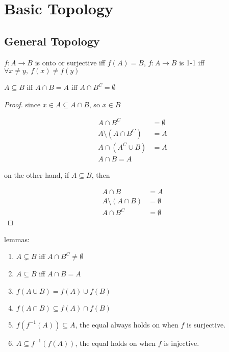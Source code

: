 \section{Basic Topology}

\subsection{General Topology}

\begin{definition}
    $f: A \to B$ is onto or surjective iff $f(A) = B$, $f: A \to B$ is 1-1 iff $\forall x \ne y,\: f(x) \ne f(y)$
\end{definition}

\begin{lem}
    $A \subseteq B$ iff $A \cap B = A$ iff $A \cap B^C = \emptyset$
\end{lem}


\begin{proof}
    since $x \in A \subseteq A \cap B$, so $x \in B$

    \begin{align*}
        A \cap B^C &= \emptyset \\
        A \setminus \left(A \cap B^C\right) &= A \\
        A \cap (A^C \cup B) &= A \\
        A \cap B = A 
    \end{align*}

    on the other hand, if $A \subseteq B$, then

    \begin{align*}
        A \cap B  &= A \\
        A \setminus \left(A \cap B \right) &= \emptyset \\
        A \cap B^C &= \emptyset
    \end{align*}
\end{proof}

\begin{lem}
lemmas:
    \begin{enumerate}
        \item $A \subsetneq B$ iff $A \cap B^C \ne \emptyset$
        \item $A \subseteq B$ iff $A \cap B = A$
        \item $f(A \cup B) = f(A) \cup f(B)$
        \item $f(A \cap B) \subseteq f(A) \cap f(B)$
        \item $f(f^{-1}(A)) \subseteq A$, the equal always holds on when $f$ is surjective.
        \item $A \subseteq f^{-1}(f(A))$, the equal holds on when $f$ is injective.
    \end{enumerate}
    
\end{lem}

